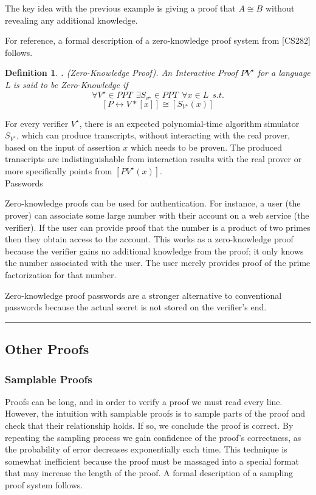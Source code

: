 \documentclass[twoside]{article}
\renewcommand{\cite}[1]{[#1]}
\newtheorem{definition}[theorem]{Definition}
\newenvironment{example}{{\bf Example:}}{\hfill\rule{2mm}{2mm}}
\begin{document}
The key idea with the previous example is giving a proof that $A \cong B$ without revealing any additional knowledge. 

For reference, a formal description of a zero-knowledge proof system from \cite{CS282} follows. 

\begin{definition}\textbf. (Zero-Knowledge Proof). An Interactive Proof $PV^{\star}$ for a language L is said to be Zero-Knowledge if 
$$\forall V^{\star} \in PPT ~~\exists S_{v^{\star}} \in PPT ~~\forall x\in L~~s.t.$$
$$[P\leftrightarrow V*[x]] \cong [S_{V^{\star}}(x)]$$
\end{definition}

For every verifier $V^{\star}$, there is an expected polynomial-time algorithm simulator $S_{V^{\star}}$, which can produce transcripts, without interacting with the real prover, based on the input of assertion $x$ which needs to be proven. The produced transcripts are indistinguishable from interaction results with the real prover or more specifically points from $[PV^{\star} (x)]$.\\

\begin{example}
Passwords

Zero-knowledge proofs can be used for authentication. 
For instance, a user (the prover) can associate some large number with their account on a web service (the verifier).
If the user can provide proof that the number is a product of two primes then they obtain access to the account. 
This works as a zero-knowledge proof because the verifier gains no additional knowledge from the proof; it only knows the number associated with the user. 
The user merely provides proof of the prime factorization for that number. 

Zero-knowledge proof passwords are a stronger alternative to conventional passwords because the actual secret is not stored on the verifier's end. 

\end{example}

\subsection{Other Proofs}
\subsubsection{Samplable Proofs}
Proofs can be long, and in order to verify a proof we must read every line. 
However, the intuition with samplable proofs is to sample parts of the proof and check that their relationship holds. If so, we conclude the proof is correct. By repeating the sampling process we gain confidence of the proof's correctness, as the probability of error decreases exponentially each time. This technique is somewhat inefficient because the proof must be massaged into a special format that may increase the length of the proof. A formal description of a sampling proof system follows.
\end{document}
